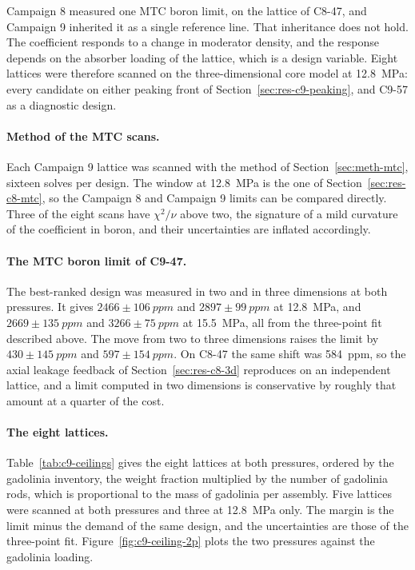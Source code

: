 Campaign 8 measured one MTC boron limit, on the
lattice of C8-47, and Campaign 9 inherited it as a single reference line.
That inheritance does not hold. The coefficient responds to a change in
moderator density, and the response depends on the absorber loading of the
lattice, which is a design variable. Eight lattices were therefore scanned
on the three-dimensional core model at \SI{12.8}{MPa}: every candidate on either peaking
front of Section~\ref{sec:res-c9-peaking}, and C9-57 as a diagnostic design.

\paragraph{Method of the MTC scans.}
Each Campaign 9 lattice was scanned with the method of
Section~\ref{sec:meth-mtc},
sixteen solves per design. The window at \SI{12.8}{MPa} is the one of
Section~\ref{sec:res-c8-mtc}, so the Campaign 8 and Campaign 9 limits
can be compared directly. Three of the eight scans have $\chi^2/\nu$
above two, the signature of a mild curvature of the coefficient in
boron, and their uncertainties are inflated accordingly.

\paragraph{The MTC boron limit of C9-47.}
The best-ranked design was measured in two and in three dimensions at
both pressures. It gives $2466 \pm \SI{106}{ppm}$ and
$2897 \pm \SI{99}{ppm}$ at \SI{12.8}{MPa}, and $2669 \pm \SI{135}{ppm}$
and $3266 \pm \SI{75}{ppm}$ at \SI{15.5}{MPa}, all from the three-point
fit described above. The move from two to three dimensions raises the
limit by $430 \pm \SI{145}{ppm}$ and $597 \pm \SI{154}{ppm}$. On
C8-47 the same shift was \SI{584}{ppm}, so the axial leakage feedback
of Section~\ref{sec:res-c8-3d} reproduces on an independent lattice,
and a limit computed in two dimensions is conservative by roughly
that amount at a quarter of the cost.

\paragraph{The eight lattices.}
Table~\ref{tab:c9-ceilings} gives the eight lattices at both pressures,
ordered by the gadolinia inventory, the weight fraction multiplied by
the number of gadolinia rods, which is proportional to the mass of
gadolinia per assembly. Five lattices were scanned at both pressures
and three at \SI{12.8}{MPa} only. The margin is the limit minus the
demand of the same design, and the uncertainties are those of the
three-point fit. Figure~\ref{fig:c9-ceiling-2p} plots the two pressures
against the gadolinia loading.

